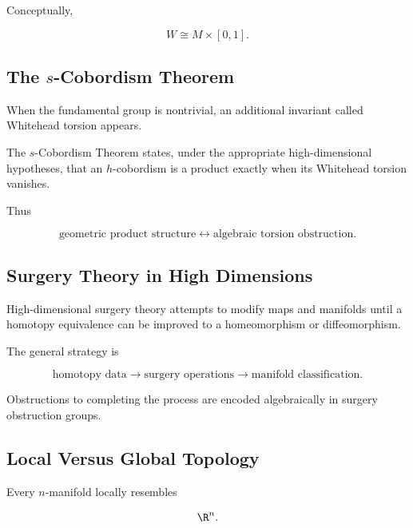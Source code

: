 Conceptually,

\[
\boxed{
W\cong M\times[0,1].
}
\]

\subsection{The \texorpdfstring{\(s\)}{s}-Cobordism Theorem}
\label{subsec:s-cobordism}

When the fundamental group is nontrivial, an additional invariant called
Whitehead torsion appears.

The \(s\)-Cobordism Theorem states, under the appropriate
high-dimensional hypotheses, that an \(h\)-cobordism is a product exactly
when its Whitehead torsion vanishes.

Thus

\[
\boxed{
\text{geometric product structure}
\longleftrightarrow
\text{algebraic torsion obstruction}.
}
\]

\subsection{Surgery Theory in High Dimensions}
\label{subsec:surgery-theory-high-dimensions}

High-dimensional surgery theory attempts to modify maps and manifolds until
a homotopy equivalence can be improved to a homeomorphism or
diffeomorphism.

The general strategy is

\[
\boxed{
\text{homotopy data}
\longrightarrow
\text{surgery operations}
\longrightarrow
\text{manifold classification}.
}
\]

Obstructions to completing the process are encoded algebraically in
surgery obstruction groups.

\subsection{Local Versus Global Topology}
\label{subsec:local-global-geometric-topology}

Every \(n\)-manifold locally resembles

\[
\R^n.
\]

